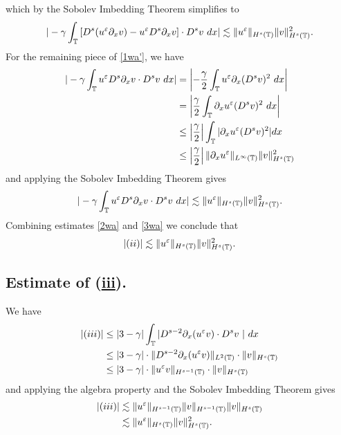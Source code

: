 which by the Sobolev Imbedding Theorem simplifies to
\begin{equation}
\begin{split}
| -\gamma \int_{\mathbb{T}} \left[ D^s(u^\varepsilon \partial_x v) - u^\varepsilon D^s
\partial_x v \right] \cdot D^s v \ dx |
\lesssim \|u^\varepsilon \|_{H^s(\mathbb{T})} \|v\|_{H^s(\mathbb{T})}^2.
\label{2wa}
\end{split}
\end{equation}
For the remaining piece of \eqref{1wa'}, we have
\begin{equation*}
\begin{split}
| - \gamma \int_{\mathbb{T}} u^\varepsilon D^s \partial_x v \cdot D^s v \ dx |
& = \left | -\frac{\gamma}{2} \int_{\mathbb{T}} u^\varepsilon \partial_x (D^s v)^2 \
dx \right |
\\
& = \left | \frac{\gamma}{2} \int_{\mathbb{T}} \partial_x u^\varepsilon (D^s v)^2 \ dx
\right |
\\
& \le \left | \frac{\gamma}{2} \right | \int_{\mathbb{T}} |\partial_x u^\varepsilon
(D^s v)^2 | dx
\\
& \le \left | \frac{\gamma}{2} \right | \|\partial_x u^\varepsilon
\|_{L^\infty(\mathbb{T})} \|v\|_{H^s(\mathbb{T})}^2
\end{split}
\end{equation*}
and applying the Sobolev Imbedding Theorem gives
\begin{equation}
\begin{split}
| - \gamma \int_{\mathbb{T}} u^\varepsilon D^s \partial_x v \cdot D^s v \ dx |
\lesssim \|u^\varepsilon \|_{H^s(\mathbb{T})} \|v\|_{H^s(\mathbb{T})}^2.
\label{3wa}
\end{split}
\end{equation}
Combining estimates \eqref{2wa} and \eqref{3wa} we conclude that
\begin{equation}
\begin{split}
|(ii)| \lesssim \|u^\varepsilon \|_{H^s(\mathbb{T})} \|v\|_{H^s(\mathbb{T})}^2.
\label{4wa}
\end{split}
\end{equation}
\subsection{Estimate of (\hyperref[8u]{iii}).} We have
\begin{equation}
\begin{split}
|(iii)|
& \le |3-\gamma| \int_{\mathbb{T}} |D^{s-2} \partial_x (u^\varepsilon v) \cdot D^s v
\ | \ dx
\\
& \le |3- \gamma| \cdot  \|D^{s-2}\partial_x (u^\varepsilon v)
\|_{L^2(\mathbb{T})} \cdot \|v\|_{H^s(\mathbb{T})}
\\
& \le |3- \gamma| \cdot  \| u^\varepsilon v \|_{H^{s -1}(\mathbb{T})} \cdot \|v\|_{H^s(\mathbb{T})}
\label{12u}
\end{split}
\end{equation}
and applying the algebra property and the Sobolev Imbedding Theorem gives
\begin{equation}
\begin{split}
|(iii)| & \lesssim \|u^\varepsilon\|_{H^{s-1}(\mathbb{T})} \|v\|_{H^{s-1}(\mathbb{T})}
\|v\|_{H^s(\mathbb{T})}
\\
& \lesssim \|u^\varepsilon\|_{H^{s}(\mathbb{T})} \|v\|_{H^{s}(\mathbb{T})}^2.
\label{13u}
\end{split}
\end{equation}
%
%
%
%
